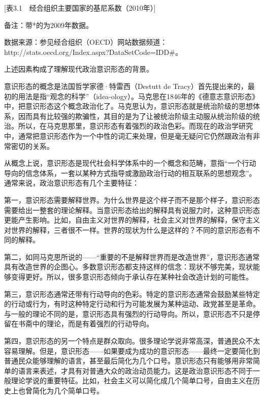 [表3.1　经合组织主要国家的基尼系数（2010年）]

备注：带*的为2009年数据。

数据来源：参见经合组织（OECD）网站数据频道：http://stats.oecd.org/Index.aspx?DataSetCode=IDD\#。

上述因素构成了理解现代政治意识形态的背景。

意识形态的概念是法国哲学家德·特雷西（Destutt de Tracy）首先提出来的，最初的用法是指“观念的科学”（idea-ology）。马克思在1846年的《德意志意识形态》中，把意识形态这个概念政治化了。马克思认为，意识形态就是统治阶级的思想体系，因而具有比较强的欺骗性，其目的是为了让被统治阶级主动服从统治阶级的统治。所以，在马克思那里，意识形态有着强烈的政治色彩。而现在的政治学研究中，通常把意识形态作为一个中性的词汇来处理，但是毫无疑问它仍然跟政治有非常密切的关系。

从概念上说，意识形态是现代社会科学体系中的一个概念和范畴，意指“一个行动导向的信念体系，一套以某种方式指导或激励政治行动的相互联系的思想观念”。通常来说，政治意识形态有几个主要特征：

第一，意识形态需要解释世界。为什么世界是这个样子而不是那个样子，意识形态需要给出一整套的理论解释。当意识形态给出的解释具有说服力时，这种意识形态更能产生影响。比如，自由主义对世界的解释，社会主义对世界的解释，保守主义对世界的解释，三者很不一样。世界的现状为什么是这样的？不同的意识形态有不同的解释。

第二，如同马克思所说的——“重要的不是解释世界而是改造世界”，意识形态通常具有改造世界的企图心。多数意识形态都支持这样的信念：现状不够完美，现状能够变得更好。所以，很多意识形态倾向于承认存在某种社会改造计划的可能性。

第三，意识形态通常还带有行动导向的色彩。特定的意识形态通常会鼓励某些特定的行动或行为，有时这种特定行动和行为可能发展为某种运动、政党甚至是革命。与一般的理论不同的是，意识形态具有强烈的行动导向。所以，意识形态不只是停留在书斋中的理论，而是有着强烈的行动导向。

第四，意识形态的另一个特点是群众取向。很多理论学说非常高深，普通民众不太容易理解。但是，意识形态——如果要成为成功的意识形态——最终一定要简化到普通民众能够理解的语言，甚至最后简化为几个口号。意识形态只有能够用非常简单的语言来表述，才具有对普通大众的政治动员能力。这是政治意识形态不同于一般理论学说的重要特征。比如，社会主义可以简化成几个简单口号，自由主义在历史上也曾简化为几个简单口号。

